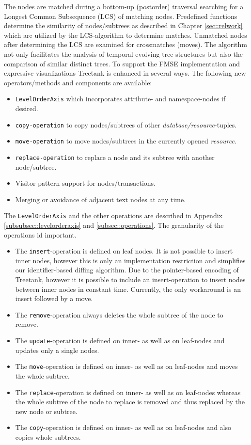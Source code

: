 The nodes are matched during a bottom-up (postorder) traversal searching for a Longest Common Subsequence (LCS) of matching nodes. Predefined functions determine the similarity of nodes/subtrees as described in Chapter \ref{sec::relwork} which are utilized by the LCS-algorithm to determine matches. Unmatched nodes after determining the LCS are examined for crossmatches (moves). The algorithm not only facilitates the analysis of temporal evolving tree-structures but also the comparison of similar distinct trees. To support the FMSE implementation and expressive visualizations Treetank is enhanced in several ways. The following new operators/methods and components are available:

\begin{itemize}
\item \texttt{LevelOrderAxis} which incorporates attribute- and namespace-nodes if desired.
\item \texttt{copy-operation} to copy nodes/subtrees of other \emph{database/resource}-tuples.
\item \texttt{move-operation} to move nodes/subtrees in the currently opened \emph{resource}.
\item \texttt{replace-operation} to replace a node and its subtree with another node/subtree.
\item Visitor pattern support for nodes/transactions.
\item Merging or avoidance of adjacent text nodes at any time.
\end{itemize}

The \texttt{LevelOrderAxis} and the other operations are described in Appendix \ref{subsubsec::levelorderaxis} and \ref{subsec::operations}. The granularity of the operations id important. 

\begin{itemize}
\item The \texttt{insert}-operation is defined on leaf nodes. It is not possible to insert inner nodes, however this is only an implementation restriction and simplifies our identifier-based diffing algorithm. Due to the pointer-based encoding of Treetank, however it is possible to include an insert-operation to insert nodes between inner nodes in constant time. Currently, the only workaround is an insert followed by a move.
\item The \texttt{remove}-operation always deletes the whole subtree of the node to remove.
\item The \texttt{update}-operation is defined on inner- as well as on leaf-nodes and updates only a single nodes.
\item The \texttt{move}-operation is defined on inner- as well as on leaf-nodes and moves the whole subtree.
\item The \texttt{replace}-operation is defined on inner- as well as on leaf-nodes whereas the whole subtree of the node to replace is removed and thus replaced by the new node or subtree.
\item The \texttt{copy}-operation is defined on inner- as well as on leaf-nodes and also copies whole subtrees.
\end{itemize}

